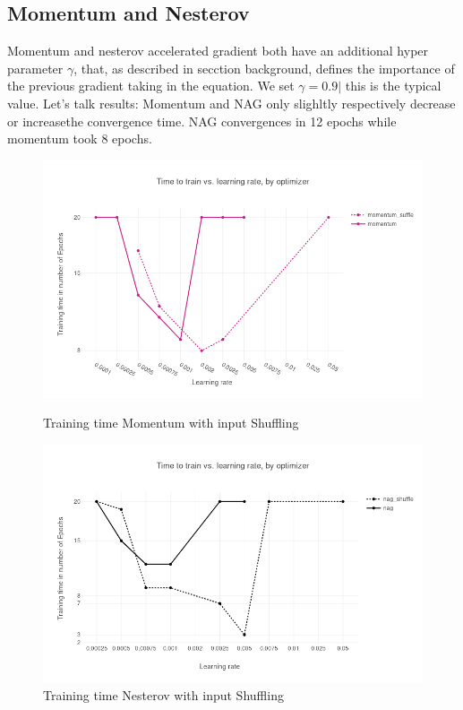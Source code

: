 \subsection{Momentum and Nesterov}
Momentum and nesterov accelerated gradient both have an additional hyper parameter $\gamma$, that, as described in secction background, defines the importance of the previous gradient taking in the equation. We set $\gamma = 0.9|$ this is the typical value. Let's talk results: Momentum and NAG only slighltly respectively decrease or increasethe convergence time. NAG convergences in 12 epochs while momentum took 8 epochs. 
\begin{figure}[H]
\centering
\begin{minipage}{.5\textwidth}
  \centering
  	\includegraphics[scale=0.3]{images/results_mom_shuffle} 
    \caption{Training time  Momentum with input Shuffling}
    \label{fig:results_mom}
  \label{fig:test1}
\end{minipage}%
\begin{minipage}{.5\textwidth}
  \centering
	\includegraphics[scale=0.3]{images/results_nag_shuffle} 
    \caption{Training time  Nesterov with input Shuffling}
    \label{fig:results_mom}
\end{minipage}
\end{figure}
